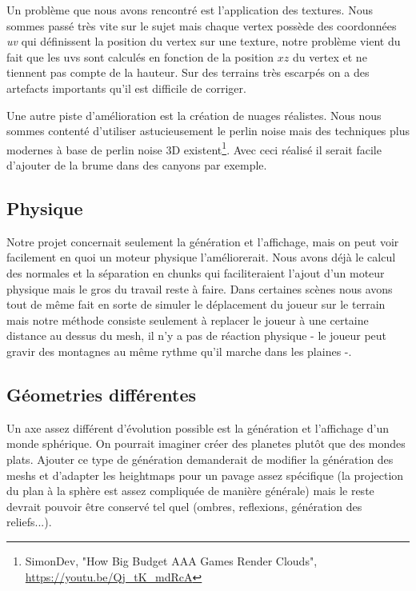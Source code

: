 \documentclass[11pt]{article} %
\begin{document}
\par
Un problème que nous avons rencontré est l'application des textures. Nous sommes passé très vite sur le sujet mais chaque vertex possède des coordonnées \textit{uv} qui définissent la position du vertex sur une texture, notre problème vient du fait que les uvs sont calculés en fonction de la position $xz$ du vertex et ne tiennent pas compte de la hauteur. Sur des terrains très escarpés on a des artefacts importants qu'il est difficile de corriger.

\par
Une autre piste d'amélioration est la création de nuages réalistes. Nous nous sommes contenté d'utiliser astucieusement le perlin noise mais des techniques plus modernes à base de perlin noise 3D existent\footnote{SimonDev, "How Big Budget AAA Games Render Clouds", \url{https://youtu.be/Qj_tK_mdRcA}}. Avec ceci réalisé il serait facile d'ajouter de la brume dans des canyons par exemple.

\subsection{Physique}

Notre projet concernait seulement la génération et l'affichage, mais on peut voir facilement en quoi un moteur physique l'améliorerait. Nous avons déjà le calcul des normales et la séparation en chunks qui faciliteraient l'ajout d'un moteur physique mais le gros du travail reste à faire. Dans certaines scènes nous avons tout de même fait en sorte de simuler le déplacement du joueur sur le terrain mais notre méthode consiste seulement à replacer le joueur à une certaine distance au dessus du mesh, il n'y a pas de réaction physique - le joueur peut gravir des montagnes au même rythme qu'il marche dans les plaines -.

\subsection{Géometries différentes}

Un axe assez différent d'évolution possible est la génération et l'affichage d'un monde sphérique. On pourrait imaginer créer des planetes plutôt que des mondes plats. Ajouter ce type de génération demanderait de modifier la génération des meshs et d'adapter les heightmaps pour un pavage assez spécifique (la projection du plan à la sphère est assez compliquée de manière générale) mais le reste devrait pouvoir être conservé tel quel (ombres, reflexions, génération des reliefs...).
\end{document}
